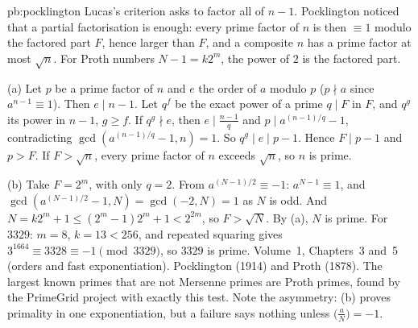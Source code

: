 \begin{solution}{pb:pocklington}
\idea Lucas's criterion asks to factor all of $n-1$. Pocklington noticed that a partial factorisation is enough: every prime
factor of $n$ is then $\equiv1$ modulo the factored part $F$, hence larger than $F$, and a composite $n$ has a prime factor at
most $\sqrt n$. For Proth numbers $N-1=k2^m$, the power of $2$ is the factored part.

\writeup (a) Let $p$ be a prime factor of $n$ and $e$ the order of $a$ modulo $p$ ($p\nmid a$ since $a^{n-1}\equiv1$). Then
$e\mid n-1$. Let $q^f$ be the exact power of a prime $q\mid F$ in $F$, and $q^g$ its power in $n-1$, $g\ge f$. If $q^g\nmid e$, then
$e\mid\frac{n-1}q$ and $p\mid a^{(n-1)/q}-1$, contradicting $\gcd(a^{(n-1)/q}-1,n)=1$. So $q^g\mid e\mid p-1$. Hence $F\mid p-1$ and
$p>F$. If $F>\sqrt n$, every prime factor of $n$ exceeds $\sqrt n$, so $n$ is prime.

(b) Take $F=2^m$, with only $q=2$. From $a^{(N-1)/2}\equiv-1$: $a^{N-1}\equiv1$, and $\gcd(a^{(N-1)/2}-1,N)=\gcd(-2,N)=1$ as $N$ is odd. And
$N=k2^m+1\le(2^m-1)2^m+1<2^{2m}$, so $F>\sqrt N$. By (a), $N$ is prime. For $3329$: $m=8$, $k=13<256$, and repeated squaring
gives $3^{1664}\equiv3328\equiv-1\pmod{3329}$, so $3329$ is prime.
\tools Volume~1, Chapters~3 and~5 (orders and fast exponentiation).
\leads Pocklington (1914) and Proth (1878). The largest known primes that are not Mersenne primes are Proth primes, found by the
PrimeGrid project with exactly this test. Note the asymmetry: (b) proves primality in one exponentiation, but a failure says
nothing unless $\bigl(\frac aN\bigr)=-1$.
\end{solution}

